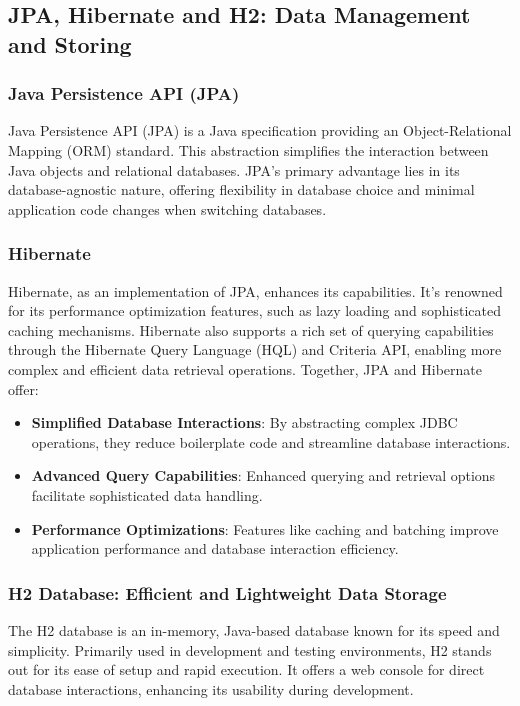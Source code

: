 \subsection{JPA, Hibernate and H2: Data Management and Storing}

\subsubsection{Java Persistence API (JPA)} 

Java Persistence API (JPA) is a Java specification providing an Object-Relational Mapping (ORM) standard. 
This abstraction simplifies the interaction between Java objects and relational databases. 
JPA's primary advantage lies in its database-agnostic nature, offering flexibility in database choice and minimal application code changes when switching databases.

\subsubsection{Hibernate} 

Hibernate, as an implementation of JPA, enhances its capabilities. 
It's renowned for its performance optimization features, such as lazy loading and sophisticated caching mechanisms. 
Hibernate also supports a rich set of querying capabilities through the Hibernate Query Language (HQL) and Criteria API, enabling more complex and efficient data retrieval operations. Together, JPA and Hibernate offer:

\begin{itemize}
  \item \textbf{Simplified Database Interactions}: By abstracting complex JDBC operations, they reduce boilerplate code and streamline database interactions.
  \item \textbf{Advanced Query Capabilities}: Enhanced querying and retrieval options facilitate sophisticated data handling.
  \item \textbf{Performance Optimizations}: Features like caching and batching improve application performance and database interaction efficiency.
\end{itemize}

\subsubsection{H2 Database: Efficient and Lightweight Data Storage} 

The H2 database is an in-memory, Java-based database known for its speed and simplicity. 
Primarily used in development and testing environments, H2 stands out for its ease of setup and rapid execution. 
It offers a web console for direct database interactions, enhancing its usability during development.



